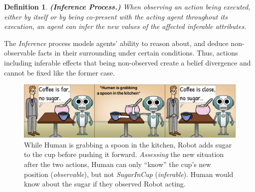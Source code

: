 \documentclass[letterpaper]{article} %
\newtheorem{definition}{Definition}
\begin{document}
\begin{definition} \label{def:inf}
    \textbf{(Inference Process.)} When observing an action being executed, either by itself or by being co-present with the acting agent throughout its execution, an agent can infer the new values of the affected inferable attributes.  
\end{definition}


The \textit{Inference} process models agents' ability to reason about, and deduce non-observable facts in their surrounding under certain conditions. Thus, actions including inferable effects that being non-observed create a belief divergence and cannot be fixed like the former case.


\begin{figure}[t!]
    \centering
    \includegraphics[width=1.0\linewidth]{figures/cartoon_obs(2).png}
    \caption{
    While Human is grabbing a spoon in the kitchen, Robot adds sugar to the cup before pushing it forward. \textit{Assessing} the new situation after the two actions, Human can only ``know'' the cup's new position (\textit{observable}), but not \textit{SugarInCup} (\textit{inferable}). Human would know about the sugar if they observed Robot acting.
    }
    \label{fig:cartoon}
\end{figure}

\end{document}
